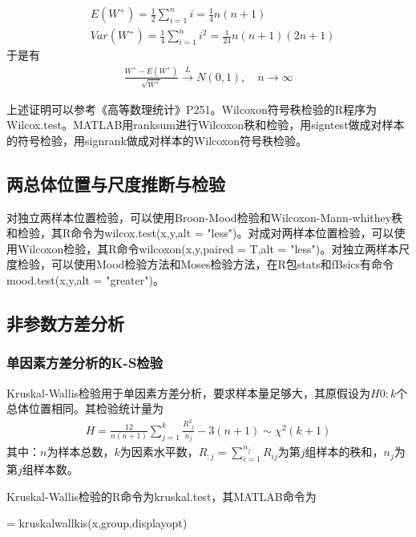             \begin{align*}
            &E(W^+) = \frac{1}{2} \sum_{i=1}^n i =\frac{1}{4}n(n+1) \\
            &Var(W^+) = \frac{1}{4}\sum_{i=1}^n i^2 = \frac{1}{24}n(n+1)(2n+1)
            \end{align*}
            于是有
            \begin{align*}
            \frac{W^+ - E(W^+)}{\sqrt{W^+}} \xrightarrow{L} N(0,1) ,\quad n\rightarrow \infty
            \end{align*}
            \par
            上述证明可以参考《高等数理统计》P251。Wilcoxon符号秩检验的R程序为Wilcox.test。MATLAB用ranksum进行Wilcoxon秩和检验，用signtest做成对样本的符号检验，用signrank做成对样本的Wilcoxon符号秩检验。
    \subsection{两总体位置与尺度推断与检验}
        \par
        对独立两样本位置检验，可以使用Broon-Mood检验和Wilcoxon-Mann-whithey秩和检验，其R命令为wilcox.test(x,y,alt = "less")。对成对两样本位置检验，可以使用Wilcoxon检验，其R命令wilcoxon(x,y,paired = T,alt = "less")。对独立两样本尺度检验，可以使用Mood检验方法和Moses检验方法，在R包stats和fBsics有命令mood.test(x,y,alt = "greater")。
    \subsection{非参数方差分析}
        \subsubsection{单因素方差分析的K-S检验}
            \par
            Kruskal-Wallis检验用于单因素方差分析，要求样本量足够大，其原假设为$H0:k$个总体位置相同。其检验统计量为
            \begin{align*}
            H = \frac{12}{n(n+1)} \sum_{j = 1}^k \frac{R_{:j}^2}{n_j} - 3(n+1) \sim \chi^2(k+1)
            \end{align*}
            其中：$n$为样本总数，$k$为因素水平数，$R_{:j} = \sum_{i=1}^{n_j}R_{ij}$为第$j$组样本的秩和，$n_j$为第$j$组样本数。
            \par
            Kruskal-Wallis检验的R命令为kruskal.test，其MATLAB命令为
            \par
            [p,table,stats] = kruskalwallkis(x,group,displayopt)

